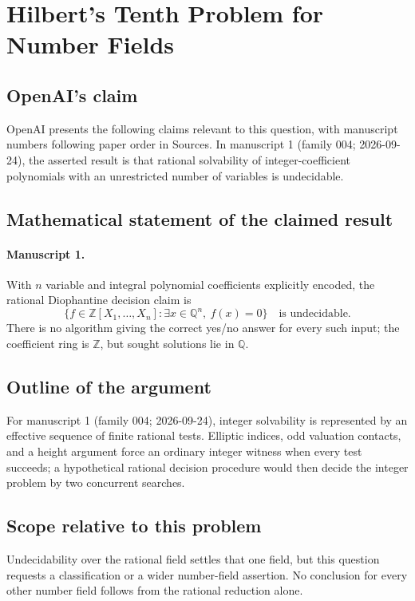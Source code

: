 \documentclass[11pt]{article}
\begin{document}
\section*{Hilbert's Tenth Problem for Number Fields}

\subsection{OpenAI's claim}
OpenAI presents the following claims relevant to this question, with manuscript numbers following paper order in Sources. In manuscript 1 (family 004; 2026-09-24), the asserted result is that rational solvability of integer-coefficient polynomials with an unrestricted number of variables is undecidable.

\subsection{Mathematical statement of the claimed result}
\paragraph{Manuscript 1.}
With $n$ variable and integral polynomial coefficients explicitly encoded, the rational Diophantine decision claim is
\[
 \{f\in\mathbb Z[X_1,\ldots,X_n]:\exists x\in\mathbb Q^n,\ f(x)=0\}
 \quad\text{is undecidable}.
\]
There is no algorithm giving the correct yes/no answer for every such input; the coefficient ring is $\mathbb Z$, but sought solutions lie in $\mathbb Q$.

\subsection{Outline of the argument}
For manuscript 1 (family 004; 2026-09-24), integer solvability is represented by an effective sequence of finite rational tests. Elliptic indices, odd valuation contacts, and a height argument force an ordinary integer witness when every test succeeds; a hypothetical rational decision procedure would then decide the integer problem by two concurrent searches.

\subsection{Scope relative to this problem}
Undecidability over the rational field settles that one field, but this question requests a classification or a wider number-field assertion. No conclusion for every other number field follows from the rational reduction alone.
\end{document}
